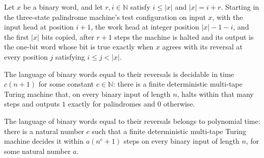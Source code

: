 \begin{lemma}
\label{Complexity.pal_test}
\leanok
{}
Let $x$ be a binary word, and let $r,i\in\mathbb{N}$ satisfy $i\le |x|$ and $|x|=i+r$.
Starting in the three-state palindrome machine's test configuration on input $x$, with
the input head at position $i+1$, the work head at integer position $|x|-1-i$, and the
first $|x|$ bits copied, after $r+1$ steps the machine is halted and its output is the
one-bit word whose bit is true exactly when $x$ agrees with its reversal at every
position $j$ satisfying $i\le j<|x|$.
\end{lemma}

\begin{theorem}
\label{Complexity.PAL_mem_DTIME_linear}
\leanok
{}
The language of binary words equal to their reversals is decidable in time $c(n+1)$ for
some constant $c\in\mathbb{N}$: there is a finite deterministic multi-tape Turing
machine that, on every binary input of length $n$, halts within that many steps and
outputs $1$ exactly for palindromes and $0$ otherwise.
\end{theorem}

\begin{theorem}
\label{Complexity.PAL_mem_P}
\leanok
{}
The language of binary words equal to their reversals belongs to polynomial time: there
is a natural number $c$ such that a finite deterministic multi-tape Turing machine
decides it within $a(n^c+1)$ steps on every binary input of length $n$, for some natural
number $a$.
\end{theorem}
